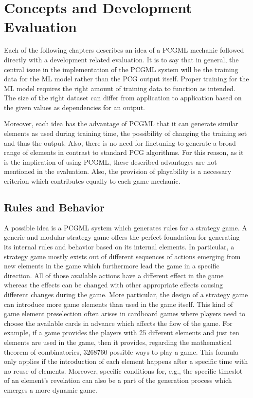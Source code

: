 \documentclass[MGS,Master,english]{twbook}%
\begin{document}
\section{Concepts and Development Evaluation}
Each of the following chapters describes an idea of a \ac{PCGML} mechanic followed directly with a development related evaluation. It is to say that in general, the central issue in the implementation of the \ac{PCGML} system will be the training data for the \ac{ML} model rather than the \ac{PCG} output itself. Proper training for the \ac{ML} model requires the right amount of training data to function as intended. The size of the right dataset can differ from application to application based on the given values as dependencies for an output. 

Moreover, each idea has the advantage of \ac{PCGML} that it can generate similar elements as used during training time, the possibility of changing the training set and thus the output. Also, there is no need for finetuning to generate a broad range of elements in contrast to standard \ac{PCG} algorithms. For this reason, as it is the implication of using \ac{PCGML}, these described advantages are not mentioned in the evaluation. Also, the provision of playability is a necessary criterion which contributes equally to each game mechanic.

\subsection{Rules and Behavior} \label{idea::rulesAndBehavior}
A possible idea is a \ac{PCGML} system which generates rules for a strategy game. A generic and modular strategy game offers the perfect foundation for generating its internal rules and behavior based on its internal elements. In particular, a strategy game mostly exists out of different sequences of actions emerging from new elements in the game which furthermore lead the game in a specific direction. All of those available actions have a different effect in the game whereas the effects can be changed with other appropriate effects causing different changes during the game. More particular, the design of a strategy game can introduce more game elements than used in the game itself. This kind of game element preselection often arises in cardboard games where players need to choose the available cards in advance which affects the flow of the game. For example, if a game provides the players with 25 different elements and just ten elements are used in the game, then it provides, regarding the mathematical theorem of combinatorics, 3268760 possible ways to play a game. This formula only applies if the introduction of each element happens after a specific time with no reuse of elements. Moreover, specific conditions for, e.g., the specific timeslot of an element's revelation can also be a part of the generation process which emerges a more dynamic game.
\end{document}
